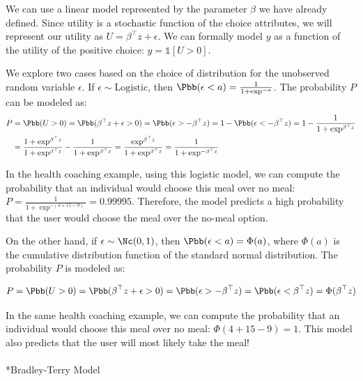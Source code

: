 \documentclass[
  letterpaper,
  DIV=11,
  numbers=noendperiod,
  oneside]{scrreprt}
\makeatletter
\let\oldparagraph\paragraph
\renewcommand{\paragraph}{
    \@ifstar
      \xxxParagraphStar
      \xxxParagraphNoStar
  }
\newcommand{\xxxParagraphStar}[1]{\oldparagraph*{#1}\mbox{}}
\newcommand{\xxxParagraphNoStar}[1]{\oldparagraph{#1}\mbox{}}
\theoremstyle{remark}
\makeatother
\begin{document}
We can use a linear model represented by the parameter \(\beta\) we have
already defined. Since utility is a stochastic function of the choice
attributes, we will represent our utility as
\(U = \beta^\top z + \epsilon\). We can formally model \(y\) as a
function of the utility of the positive choice: \(y = \mathds{1}[U>0]\).

We explore two cases based on the choice of distribution for the
unobserved random variable \(\epsilon\). If
\(\epsilon \sim \text{Logistic}\), then
\(\Pbb(\epsilon < a) = \frac{1}{1 + \exp^{-a}}\). The probability \(P\)
can be modeled as: \[\begin{aligned}
    P & = \Pbb(U > 0) = \Pbb(\beta^\top z + \epsilon > 0) = \Pbb( \epsilon > -\beta^\top z) = 1 - \Pbb( \epsilon < -\beta^\top z) = 1 - \frac{1}{1 + \exp^{\beta^\top z}} \\
    & = \frac{1 + \exp^{\beta^\top z}}{1 + \exp^{\beta^\top z}} - \frac{1}{1 + \exp^{\beta^\top z}} = \frac{\exp^{\beta^\top z}}{1 + \exp^{\beta^\top z}} = \frac{1}{1 + \exp^{-\beta^\top z}}
\end{aligned}\]

In the health coaching example, using this logistic model, we can
compute the probability that an individual would choose this meal over
no meal: \(P = \frac{1}{1 + \exp^{-(4 + 15 - 9)}} = 0.99995\).
Therefore, the model predicts a high probability that the user would
choose the meal over the no-meal option.

On the other hand, if \(\epsilon \sim \Nc(0, 1)\), then
\(\Pbb(\epsilon < a) = \Phi(a)\), where \(\Phi(a)\) is the cumulative
distribution function of the standard normal distribution. The
probability \(P\) is modeled as:

\[P = \Pbb(U > 0) = \Pbb(\beta^\top z + \epsilon > 0) = \Pbb( \epsilon > -\beta^\top z) = \Pbb( \epsilon < \beta^\top z) = \Phi(\beta^\top z)\]

In the same health coaching example, we can compute the probability that
an individual would choose this meal over no meal:
\(\Phi(4 + 15 - 9) = 1\). This model also predicts that the user will
most likely take the meal!

\paragraph*{Bradley-Terry Model}\label{bradley-terry-model}
\end{document}
